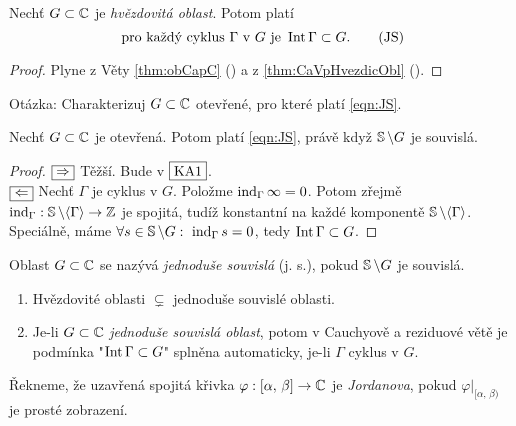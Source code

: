 \begin{note} Nechť $G\subset\operatorname{\mathbb{C}}$ je \emph{hvězdovitá oblast}. Potom platí 
\begin{equation}
    \text{ pro každý cyklus } \Gamma \text{ v } G \text{ je } \operatorname{Int}\Gamma\subset G.
    \tag{JS}
    \label{eqn:JS}
\end{equation}
\end{note}
\begin{proof}
Plyne z Věty \cref{thm:obCapC} () a z \cref{thm:CaVpHvezdicObl} ().
\end{proof}

 Otázka: Charakterizuj $G\subset\operatorname{\mathbb{C}}$ otevřené, pro které platí \cref{eqn:JS}.
 
\begin{theorem} 
Nechť $G\subset\operatorname{\mathbb{C}}$ je otevřená. Potom platí \cref{eqn:JS}, právě když $\operatorname{\mathbb{S}}\setminus G$ je souvislá.
\end{theorem}

\begin{proof}
$\fbox{$\Rightarrow$}$ Těžší. Bude v $\fbox{KA1}$.\\
$\fbox{$\Leftarrow$}$ Nechť $\Gamma$ je cyklus v $G$. Položme $\operatorname{ind}_\Gamma \infty=0$. Potom zřejmě $\operatorname{ind}_\Gamma:\operatorname{\mathbb{S}}\setminus\langle\Gamma\rangle\rightarrow \operatorname{\mathbb{Z}}$ je spojitá, tudíž konstantní na každé komponentě $\operatorname{\mathbb{S}}\setminus\langle\Gamma\rangle$. Speciálně, máme $\forall s\in \Sp\setminus G:\ \ind_\Gamma s =0$, tedy $\operatorname{Int}\Gamma\subset G$.
\end{proof}

\begin{definition}
Oblast $G\subset \operatorname{\mathbb{C}}$ se nazývá \emph{jednoduše souvislá} (j. s.), pokud $\operatorname{\mathbb{S}}\setminus G$ je souvislá.
\end{definition}
\newpage

\begin{note}
\begin{enumerate}\mbox{}
    \item 
        Hvězdovité oblasti $\subsetneq$ jednoduše souvislé oblasti.
    \item
        Je-li $G\subset\operatorname{\mathbb{C}}$ \emph{jednoduše souvislá oblast}, potom v Cauchyově a reziduové větě je podmínka "$\operatorname{Int}\Gamma\subset G$"\textbf{ } splněna automaticky, je-li $\Gamma$ cyklus v $G$.
\end{enumerate}
\end{note}

\begin{definition}
Řekneme, že uzavřená spojitá křivka $\varphi:[\alpha,\, \beta]\rightarrow\operatorname{\mathbb{C}}$ je \emph{Jordanova}, pokud $\varphi\big\rvert_{[\alpha,\, \beta)}$ je prosté zobrazení.
\end{definition}


